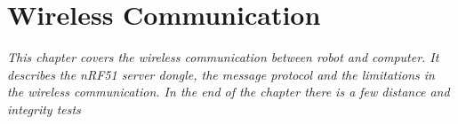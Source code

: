 \chapter{Wireless Communication}
\textit{This chapter covers the wireless communication between robot and computer. It describes the nRF51 server dongle, the message protocol and the limitations in the wireless communication. In the end of the chapter there is a few distance and integrity tests}


